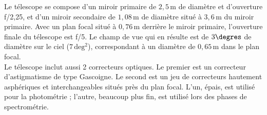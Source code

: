 \documentclass[11pt, twoside, a4paper, openright]{report}
\begin{document}
Le télescope se compose d'un miroir primaire de $2,5\,\mathrm{m}$ de diamètre et d'ouverture f/2,25, et d'un miroir secondaire de $1,08\,\mathrm{m}$ de diamètre situé à $3,6\,\mathrm{m}$ du miroir primaire. Avec un plan focal situé à $0,76\,\mathrm{m}$ derrière le miroir primaire, l'ouverture finale du télescope est f/5. Le champ de vue qui en résulte est de $3\degres$ de diamètre sur le ciel ($7\,\mathrm{deg^{2}}$), correspondant à un diamètre de $0,65\,\mathrm{m}$ dans le plan focal. \\
Le télescope inclut aussi 2 correcteurs optiques. Le premier est un correcteur d'astigmatisme de type Gascoigne. Le second est un jeu de correcteurs hautement asphériques et interchangeables situés près du plan focal. L'un, épais, est utilisé pour la photométrie ; l'autre, beaucoup plus fin, est utilisé lors des phases de spectrométrie.
\end{document}
